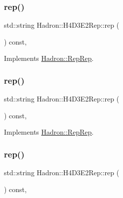 \subsubsection{\texorpdfstring{rep()}{rep()}\hspace{0.1cm}{\footnotesize\ttfamily [2/5]}}
{\footnotesize\ttfamily std\+::string Hadron\+::\+H4\+D3\+E2\+Rep\+::rep (\begin{DoxyParamCaption}{ }\end{DoxyParamCaption}) const\hspace{0.3cm}{\ttfamily [inline]}, {\ttfamily [virtual]}}



Implements \mbox{\hyperlink{structHadron_1_1RepRep_ab3213025f6de249f7095892109575fde}{Hadron\+::\+Rep\+Rep}}.

\mbox{\label{structHadron_1_1H4D3E2Rep_a11d0a71e415f309565e9ca158248aa60}} 
\subsubsection{\texorpdfstring{rep()}{rep()}\hspace{0.1cm}{\footnotesize\ttfamily [3/5]}}
{\footnotesize\ttfamily std\+::string Hadron\+::\+H4\+D3\+E2\+Rep\+::rep (\begin{DoxyParamCaption}{ }\end{DoxyParamCaption}) const\hspace{0.3cm}{\ttfamily [inline]}, {\ttfamily [virtual]}}



Implements \mbox{\hyperlink{structHadron_1_1RepRep_ab3213025f6de249f7095892109575fde}{Hadron\+::\+Rep\+Rep}}.

\mbox{\label{structHadron_1_1H4D3E2Rep_a11d0a71e415f309565e9ca158248aa60}} 
\subsubsection{\texorpdfstring{rep()}{rep()}\hspace{0.1cm}{\footnotesize\ttfamily [4/5]}}
{\footnotesize\ttfamily std\+::string Hadron\+::\+H4\+D3\+E2\+Rep\+::rep (\begin{DoxyParamCaption}{ }\end{DoxyParamCaption}) const\hspace{0.3cm}{\ttfamily [inline]}, {\ttfamily [virtual]}}



